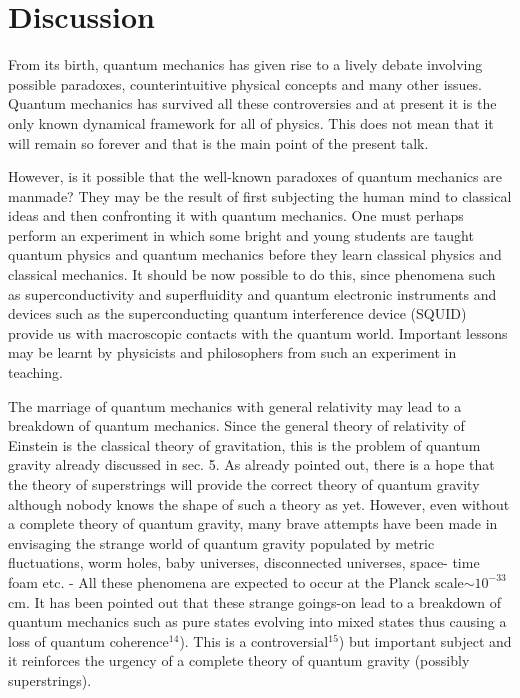 \section{Discussion}

From its birth, quantum mechanics has given rise to a lively debate involving possible
paradoxes, counterintuitive physical concepts and many other issues. Quantum mechanics
has survived all these controversies and at present it is the only known dynamical framework for all of physics. This does not mean that it will remain so forever and that is the
main point of the present talk. 

However, is it possible that the well-known paradoxes of quantum mechanics are manmade? They may be the result of first subjecting the human mind to classical ideas and
then confronting it with quantum mechanics. One must perhaps perform an experiment in
which some bright and young students are taught quantum physics and quantum mechanics
before they learn classical physics and classical mechanics. It should be now possible to do
this, since phenomena such as superconductivity and superfluidity and quantum electronic
instruments and devices such as the superconducting quantum interference device (SQUID)
provide us with macroscopic contacts with the quantum world. Important lessons may be
learnt by physicists and philosophers from such an experiment in teaching. 

The marriage of quantum mechanics with general relativity may lead to a breakdown
of quantum mechanics. Since the general theory of relativity of Einstein is the classical
theory of gravitation, this is the problem of quantum gravity already discussed in sec. 5.
As already pointed out, there is a hope that the theory of superstrings will provide the
correct theory of quantum gravity although nobody knows the shape of such a theory as
yet. However, even without a complete theory of quantum gravity, many brave attempts
have been made in envisaging the strange world of quantum gravity populated by metric
fluctuations, worm holes, baby universes, disconnected universes, space- time foam etc.
- All these phenomena are expected to occur at the Planck scale$\sim 10^{-33}$ cm. It has been
pointed out that these strange goings-on lead to a breakdown of quantum mechanics such
as pure states evolving into mixed states thus causing a loss of quantum coherence$^{14}$).
This is a controversial$^{15}$) but important subject and it reinforces the urgency of a complete
theory of quantum gravity (possibly superstrings). 

